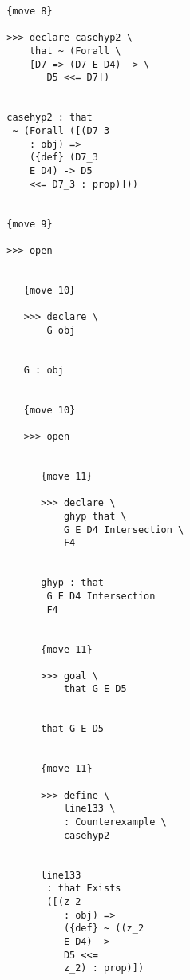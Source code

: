 \documentclass[12pt]{article}
\begin{document}
\begin{verbatim}
                           {move 8}

                           >>> declare casehyp2 \
                               that ~ (Forall \
                               [D7 => (D7 E D4) -> \
                                  D5 <<= D7])


                           casehyp2 : that 
                            ~ (Forall ([(D7_3 
                               : obj) => 
                               ({def} (D7_3 
                               E D4) -> D5 
                               <<= D7_3 : prop)]))


                           {move 9}

                           >>> open


                              {move 10}

                              >>> declare \
                                  G obj


                              G : obj


                              {move 10}

                              >>> open


                                 {move 11}

                                 >>> declare \
                                     ghyp that \
                                     G E D4 Intersection \
                                     F4


                                 ghyp : that 
                                  G E D4 Intersection 
                                  F4


                                 {move 11}

                                 >>> goal \
                                     that G E D5


                                 that G E D5


                                 {move 11}

                                 >>> define \
                                     line133 \
                                     : Counterexample \
                                     casehyp2


                                 line133 
                                  : that Exists 
                                  ([(z_2 
                                     : obj) => 
                                     ({def} ~ ((z_2 
                                     E D4) -> 
                                     D5 <<= 
                                     z_2) : prop)])



\end{verbatim}
\end{document}
